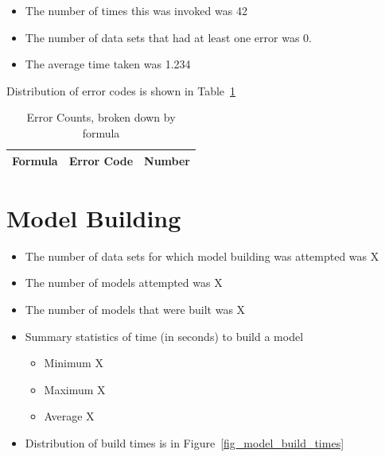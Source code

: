 \documentclass[letterpaper,12pt]{article}
\newcommand{\bi}{\begin{itemize}}
\newcommand{\ei}{\end{itemize}}
\newcommand{\NumPLPSuccessA}{42}
\newcommand{\NumPLPErrorsB}{0}
\newcommand{\AvgTimePLPB}{1.234}
\newcommand{\NumDataSetsForModel}{X}
\newcommand{\NumModelsAttempted}{X}
\newcommand{\NumModelsSucceeded}{X}
\newcommand{\ModelMinTime}{X}
\newcommand{\ModelMaxTime}{X}
\newcommand{\ModelAvgTime}{X}
\begin{document}
\bi
\item The number of times this was invoked was \NumPLPSuccessA
\item The number of data sets that had at least one error was
  \NumPLPErrorsB.
\item The average time taken was \AvgTimePLPB
\ei

Distribution of error codes is shown in Table~\ref{plp2_errs}
\begin{table}
  \centering
  \begin{tabular}{|l|l|l|} \hline \hline
    {\bf Formula} & {\bf Error Code} & {\bf Number} \\ \hline 
     
    \hline
  \end{tabular}
  \caption{Error Counts, broken down by formula}
  \label{plp2_errs}
\end{table}

\section{Model Building}
\bi
\item The number of data sets for which model building was attempted was
  \NumDataSetsForModel
\item The number of models attempted was \NumModelsAttempted
\item The number of models that were built was \NumModelsSucceeded
\item Summary statistics of time (in seconds) to build a model
  \bi
\item Minimum \ModelMinTime
\item Maximum \ModelMaxTime
\item Average \ModelAvgTime
\ei
\item Distribution of build times is in Figure~\ref{fig_model_build_times}
\ei
\begin{figure}
\end{figure}
\end{document}

